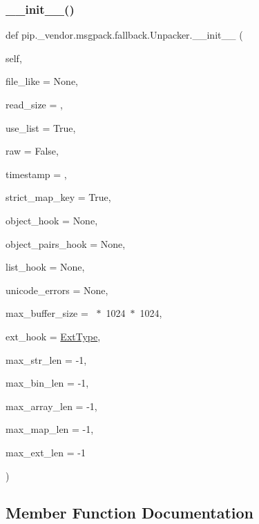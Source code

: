 \subsubsection{\texorpdfstring{\+\_\+\+\_\+init\+\_\+\+\_\+()}{\_\_init\_\_()}}
{\footnotesize\ttfamily def pip.\+\_\+vendor.\+msgpack.\+fallback.\+Unpacker.\+\_\+\+\_\+init\+\_\+\+\_\+ (\begin{DoxyParamCaption}\item[{}]{self,  }\item[{}]{file\+\_\+like = {\ttfamily None},  }\item[{}]{read\+\_\+size = {},  }\item[{}]{use\+\_\+list = {\ttfamily True},  }\item[{}]{raw = {\ttfamily False},  }\item[{}]{timestamp = {},  }\item[{}]{strict\+\_\+map\+\_\+key = {\ttfamily True},  }\item[{}]{object\+\_\+hook = {\ttfamily None},  }\item[{}]{object\+\_\+pairs\+\_\+hook = {\ttfamily None},  }\item[{}]{list\+\_\+hook = {\ttfamily None},  }\item[{}]{unicode\+\_\+errors = {\ttfamily None},  }\item[{}]{max\+\_\+buffer\+\_\+size = {~$\ast$~1024~$\ast$~1024},  }\item[{}]{ext\+\_\+hook = {\ttfamily \hyperlink{classpip_1_1__vendor_1_1msgpack_1_1ext_1_1ExtType}{Ext\+Type}},  }\item[{}]{max\+\_\+str\+\_\+len = {\ttfamily -\/1},  }\item[{}]{max\+\_\+bin\+\_\+len = {\ttfamily -\/1},  }\item[{}]{max\+\_\+array\+\_\+len = {\ttfamily -\/1},  }\item[{}]{max\+\_\+map\+\_\+len = {\ttfamily -\/1},  }\item[{}]{max\+\_\+ext\+\_\+len = {\ttfamily -\/1} }\end{DoxyParamCaption})}



\subsection{Member Function Documentation}
\mbox{\label{classpip_1_1__vendor_1_1msgpack_1_1fallback_1_1Unpacker_a0598a730129601f0a8c20f38d5cee2d9}} 
